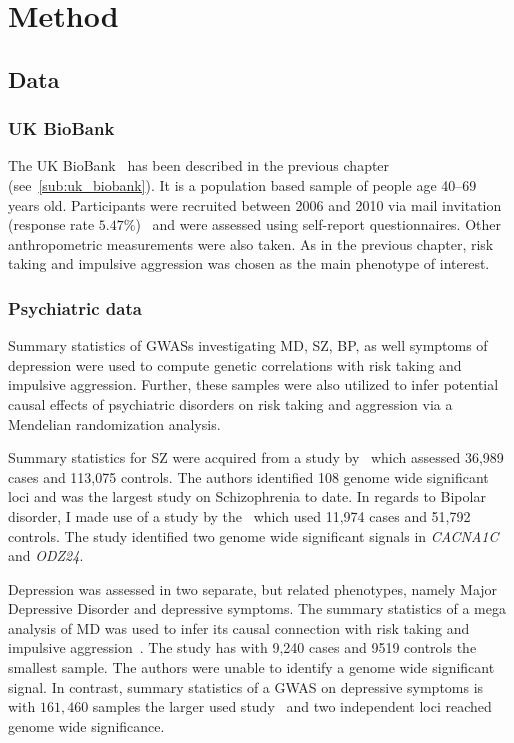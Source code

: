 \section{Method}
\label{sec:method}

\subsection{Data}
\label{sub:data}

\subsubsection{UK BioBank}
\label{ssub:uk_biobank_psych}

The UK BioBank~\cite{Allen2014} has been described in the previous chapter (see~\ref{sub:uk_biobank}).
It is a population based sample of people age 40--69 years old. 
Participants were recruited between 2006 and 2010 via mail invitation (response rate $5.47\%$)~\cite{Sudlow2015} and were assessed using self-report questionnaires. Other anthropometric measurements were also taken.
As in the previous chapter, risk taking and impulsive aggression was chosen as the main phenotype of interest.

\subsubsection{Psychiatric data}
\label{ssub:psychiatric_data}

Summary statistics of GWASs investigating MD, SZ, BP, as well symptoms of depression were used to compute genetic correlations with risk taking and impulsive aggression.
Further, these samples were also utilized to infer potential causal effects of psychiatric disorders on risk taking and aggression via a Mendelian randomization analysis.

Summary statistics for SZ were acquired from a study by~\citet{Ripke2014} which assessed 36,989 cases and 113,075 controls.
The authors identified 108 genome wide significant loci and was the largest study on Schizophrenia to date.
In regards to Bipolar disorder, I made use of a study by the~\citet{PsychiatricGWASConsortiumBipolarDisorderWorkingGroup2011} which used 11,974 cases and 51,792 controls.
The study identified two genome wide significant signals in \textit{CACNA1C} and \textit{ODZ24}.

Depression was assessed in two separate, but related phenotypes, namely Major Depressive Disorder and depressive symptoms.
The summary statistics of a mega analysis of MD was used to infer its causal connection with risk taking and impulsive aggression~\cite{MajorDepressiveDisorderWorkingGroupofthePsychiatricGWASConsortium2013}.
The study has with 9,240 cases and 9519 controls the smallest sample. 
The authors were unable to identify a genome wide significant signal.
In contrast, summary statistics of a GWAS on depressive symptoms is with $161,460$ samples the larger used study~\cite{Okbay2016} and two independent loci reached genome wide significance.  

